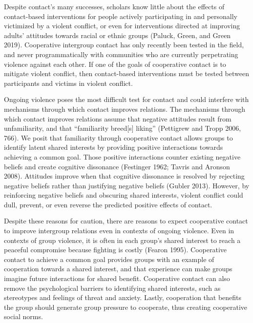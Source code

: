 \documentclass[11pt]{article}
\begin{document}
Despite contact's many successes, scholars know little about the effects
of contact-based interventions for people actively participating in and
personally victimized by a violent conflict, or even for interventions
directed at improving adults' attitudes towards racial or ethnic groups
(Paluck, Green, and Green 2019). Cooperative intergroup contact has only
recently been tested in the field, and never programmatically with
communities who are currently perpetrating violence against each other.
If one of the goals of cooperative contact is to mitigate violent
conflict, then contact-based interventions must be tested between
participants and victims in violent conflict.

Ongoing violence poses the most difficult test for contact and could
interfere with mechanisms through which contact improves relations. The
mechanisms through which contact improves relations assume that negative
attitudes result from unfamiliarity, and that ``familiarity breed{[}s{]}
liking'' (Pettigrew and Tropp 2006, 766). We posit that familiarity
through cooperative contact allows groups to identify latent shared
interests by providing positive interactions towards achieving a common
goal. Those positive interactions counter existing negative beliefs and
create cognitive dissonance (Festinger 1962; Tavris and Aronson 2008).
Attitudes improve when that cognitive dissonance is resolved by
rejecting negative beliefs rather than justifying negative beliefs
(Gubler 2013). However, by reinforcing negative beliefs and obscuring
shared interests, violent conflict could dull, prevent, or even reverse
the predicted positive effects of contact.

Despite these reasons for caution, there are reasons to expect
cooperative contact to improve intergroup relations even in contexts of
ongoing violence. Even in contexts of group violence, it is often in
each group's shared interest to reach a peaceful compromise because
fighting is costly (Fearon 1995). Cooperative contact to achieve a
common goal provides groups with an example of cooperation towards a
shared interest, and that experience can make groups imagine future
interactions for shared benefit. Cooperative contact can also remove the
psychological barriers to identifying shared interests, such as
stereotypes and feelings of threat and anxiety. Lastly, cooperation that
benefits the group should generate group pressure to cooperate, thus
creating cooperative social norms.
\end{document}
